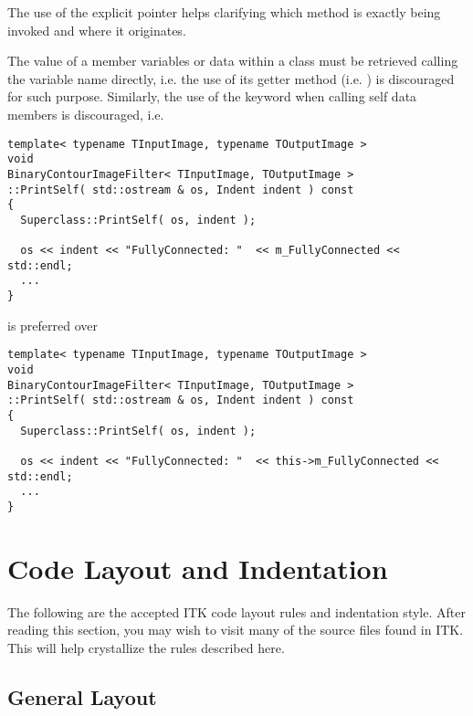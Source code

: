 The use of the explicit  pointer helps clarifying which method is
exactly being invoked and where it originates.

The value of a member variables or data within a class must be retrieved calling
the variable name directly, i.e. the use of its getter method (i.e.
) is discouraged for such purpose. Similarly, the use of the
 keyword when calling self data members is discouraged, i.e.

\small
\begin{verbatim}
template< typename TInputImage, typename TOutputImage >
void
BinaryContourImageFilter< TInputImage, TOutputImage >
::PrintSelf( std::ostream & os, Indent indent ) const
{
  Superclass::PrintSelf( os, indent );

  os << indent << "FullyConnected: "  << m_FullyConnected << std::endl;
  ...
}
\end{verbatim}
\normalsize

is preferred over

\small
\begin{verbatim}
template< typename TInputImage, typename TOutputImage >
void
BinaryContourImageFilter< TInputImage, TOutputImage >
::PrintSelf( std::ostream & os, Indent indent ) const
{
  Superclass::PrintSelf( os, indent );

  os << indent << "FullyConnected: "  << this->m_FullyConnected << std::endl;
  ...
}
\end{verbatim}
\normalsize


\section{Code Layout and Indentation}
\label{sec:CodeLayoutAndIndentation}

The following are the accepted ITK code layout rules and indentation style.
After reading this section, you may wish to visit many of the source files found
in ITK. This will help crystallize the rules described here.


\subsection{General Layout}
\label{subsec:GeneralLayout}

